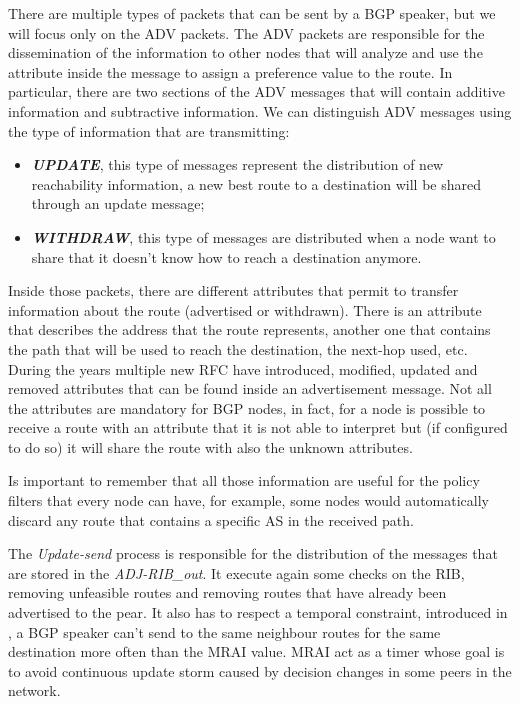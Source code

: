 There are multiple types of packets that can be sent by a \ac{BGP} speaker, but
we will focus only on the \ac{ADV} packets.
The \ac{ADV} packets are responsible for the dissemination of the information
to other nodes that will analyze and use the attribute inside the message
to assign a preference value to the route.
In particular, there are two sections of the \ac{ADV} messages that will
contain additive information and subtractive information.
We can distinguish \ac{ADV} messages using the type of information that are
transmitting:
\begin{itemize}
	\item \textbf{\textit{UPDATE}}, this type of messages represent the distribution
		of new reachability information, a new best route to a destination will be
		shared through an update message;
	\item \textbf{\textit{WITHDRAW}}, this type of messages are distributed when
		a node want to share that it doesn't know how to reach
		a destination anymore.
\end{itemize}
Inside those packets, there are different attributes that permit to transfer
information about the route (advertised or withdrawn).
There is an attribute that describes the address that the route represents,
another one that contains the path that will be used to reach the
destination, the next-hop used, etc.
During the years multiple new \ac{RFC} have introduced, modified, updated and removed
attributes that can be found inside an advertisement message.
Not all the attributes are mandatory for \ac{BGP} nodes, in fact, for a node
is possible to receive a route with an attribute that it is not able to interpret
but (if configured to do so) it will share the route with also the unknown
attributes.

Is important to remember that all those information are useful for the policy
filters that every node can have, for example, some nodes would automatically discard
any route that contains a specific \ac{AS} in the received path.

The \textit{Update-send} process is responsible for the distribution of the
messages that are stored in the \textit{ADJ-RIB\_out}.
It execute again some checks on the \ac{RIB}, removing unfeasible routes
and removing routes that have already been advertised to the pear.
It also has to respect a temporal constraint, introduced in \cite{rfc4271},
a \ac{BGP} speaker can't send to the same neighbour routes for the same destination
more often than the \ac{MRAI} value.
\ac{MRAI} act as a timer whose goal is to avoid continuous update storm caused
by decision changes in some peers in the network.


